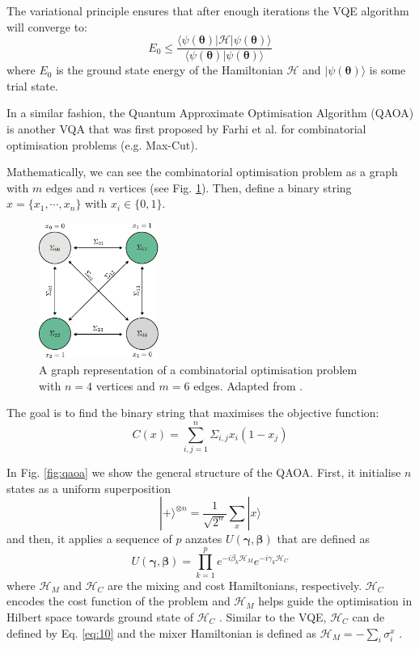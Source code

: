 \documentclass[prx,twocolumn,floatfix,superscriptaddress,longbibliography]{revtex4-1}
\begin{document}
The variational principle ensures that after enough iterations the VQE algorithm will converge to:
\begin{equation}
  \label{eq:13}
  E_0 \leq \frac{\langle \psi(\boldsymbol{\theta})|\mathcal{H}|\psi(\boldsymbol{\theta})\rangle}{\langle \psi(\boldsymbol{\theta})|\psi(\boldsymbol{\theta})\rangle}
\end{equation}
where $E_0$ is the ground state energy of the Hamiltonian $\mathcal{H}$ and $|\psi(\boldsymbol{\theta})\rangle$ is some trial state.

In a similar fashion, the Quantum Approximate Optimisation Algorithm (QAOA) is another VQA that was first 
proposed by Farhi et al. \cite{Farhi2014} for combinatorial optimisation problems (e.g. Max-Cut).

Mathematically, we can see the combinatorial optimisation problem as a graph with $m$ edges and $n$ vertices (see Fig. \ref{fig:combinatorial}). Then, define a binary string $x = \{x_1,\cdots, x_n\}$ with $x_i \in \{0, 1\}$. 
\begin{figure}[h!]
\centering 
\includegraphics[width=0.35\textwidth]{combinatorial-problem.pdf}
  \caption{\label{fig:combinatorial} A graph representation of a combinatorial optimisation problem with $n =4$ vertices and $m=6$ edges. Adapted from \cite{Baker2022}.} 
\end{figure}
The goal is to find the binary string that maximises the objective function: 
\begin{equation}
  \label{eq:14}
  C(x) = \sum_{i,j=1}^{n} \Sigma_{i,j} x_i (1-x_j)
\end{equation}

In Fig. \ref{fig:qaoa} we show the general structure of the QAOA. First, it initialise $n$ states as a uniform superposition
\begin{equation}
  \label{eq:15}
  |+\rangle^{\otimes n} = \frac{1}{\sqrt{2^n}} \sum_{x} |x\rangle 
\end{equation}
and then, it applies a sequence of $p$ anzates $U(\boldsymbol{\gamma}, \boldsymbol{\beta})$  that are defined as 
\begin{equation}
  \label{eq:16}
  U(\boldsymbol{\gamma}, \boldsymbol{\beta}) = \prod_{k=1}^{p} e^{-i\beta_k \mathcal{H}_M} e^{-i\gamma_k \mathcal{H}_C}
\end{equation}
where $\mathcal{H}_M$ and $\mathcal{H}_C$ are the mixing and cost Hamiltonians, respectively. $\mathcal{H}_C$ encodes the cost function of the problem and $\mathcal{H}_M$ helps guide the optimisation in Hilbert space towards ground state of $\mathcal{H}_C$ \cite{Moll2018}. Similar to the VQE, $\mathcal{H}_C$ can de defined by Eq. \ref{eq:10} and the mixer Hamiltonian 
is defined as $\mathcal{H}_M = -\sum_{i} \sigma_i^x$ \cite{Moll2018}.
\end{document}
